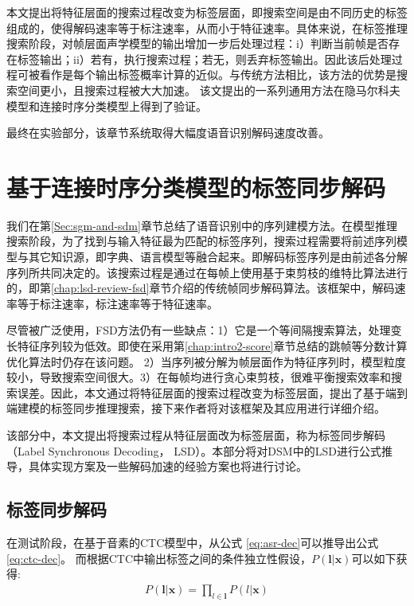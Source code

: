 本文提出将特征层面的搜索过程改变为标签层面，即搜索空间是由不同历史的标签组成的，使得解码速率等于标注速率，从而小于特征速率。具体来说，在标签推理搜索阶段，对帧层面声学模型的输出增加一步后处理过程：i）判断当前帧是否存在标签输出；ii）若有，执行搜索过程；若无，则丢弃标签输出。因此该后处理过程可被看作是每个输出标签概率计算的近似。与传统方法相比，该方法的优势是搜索空间更小，且搜索过程被大大加速。
该文提出的一系列通用方法在隐马尔科夫模型和连接时序分类模型上得到了验证。

最终在实验部分，该章节系统取得大幅度语音识别解码速度改善。

\section{基于连接时序分类模型的标签同步解码}
\label{chap:lsd-ctc}

我们在第\ref{Sec:sgm-and-sdm}章节总结了语音识别中的序列建模方法。在模型推理搜索阶段，为了找到与输入特征最为匹配的标签序列，搜索过程需要将前述序列模型与其它知识源，即字典、语言模型等融合起来。即解码标签序列是由前述各分解序列所共同决定的。该搜索过程是通过在每帧上使用基于束剪枝的维特比算法进行的\cite{forney1973viterbi}，即第\ref{chap:lsd-review-fsd}章节介绍的传统帧同步解码算法。该框架中，解码速率等于标注速率，标注速率等于特征速率。

尽管被广泛使用，FSD方法仍有一些缺点：1）它是一个等间隔搜索算法，处理变长特征序列较为低效。即使在采用第\ref{chap:intro2-score}章节总结的跳帧等分数计算优化算法时仍存在该问题。 2）当序列被分解为帧层面作为特征序列时，模型粒度较小，导致搜索空间很大。3）在每帧均进行贪心束剪枝，很难平衡搜索效率和搜索误差。因此，本文通过将特征层面的搜索过程改变为标签层面，提出了基于端到端建模的标签同步推理搜索，接下来作者将对该框架及其应用进行详细介绍。


该部分中，本文提出将搜索过程从特征层面改为标签层面，称为标签同步解码（Label Synchronous Decoding， LSD）。本部分将对DSM中的LSD进行公式推导，具体实现方案及一些解码加速的经验方案也将进行讨论。

\subsection{标签同步解码}
\label{chap:lsd-lsd-ctc-method}
在测试阶段，在基于音素的CTC模型中，从公式 \ref{eq:asr-dec}可以推导出公式\ref{eq:ctc-dec}。 而根据CTC中输出标签之间的条件独立性假设，$P(\mathbf{l}|\mathbf{x})$可以如下获得:
\begin{equation} \label{eq:indep-output-ctc}
  \begin{split}
        P(\mathbf{l}|\mathbf{x}) 
        = \prod_{l\in\mathbf{l}} P(l|\mathbf{x}) \end{split}
       \end{equation}

